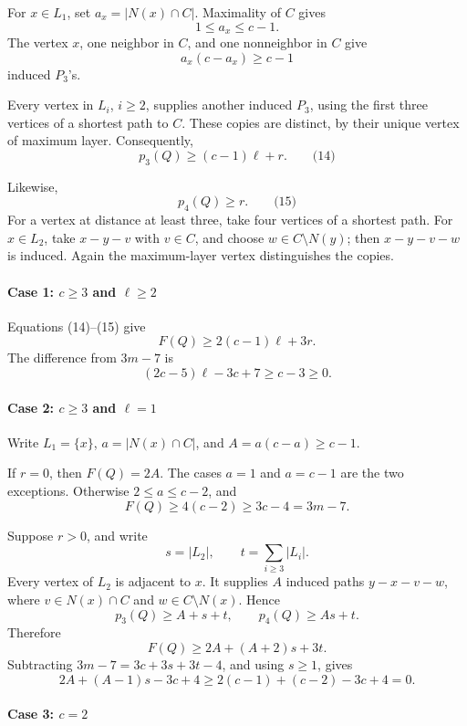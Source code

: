 \documentclass[
  11pt,
  a4paper,
]{article}
\begin{document}
For \(x\in L_1\), set \(a_x=|N(x)\cap C|\). Maximality of \(C\) gives \[
1\le a_x\le c-1.
\] The vertex \(x\), one neighbor in \(C\), and one nonneighbor in \(C\)
give \[
a_x(c-a_x)\ge c-1
\] induced \(P_3\)'s.

Every vertex in \(L_i\), \(i\ge2\), supplies another induced \(P_3\),
using the first three vertices of a shortest path to \(C\). These copies
are distinct, by their unique vertex of maximum layer. Consequently, \[
p_3(Q)\ge(c-1)\ell+r.
\qquad\text{(14)}
\]

Likewise, \[
p_4(Q)\ge r.
\qquad\text{(15)}
\] For a vertex at distance at least three, take four vertices of a
shortest path. For \(x\in L_2\), take \(x-y-v\) with \(v\in C\), and
choose \(w\in C\setminus N(y)\); then \(x-y-v-w\) is induced. Again the
maximum-layer vertex distinguishes the copies.

\paragraph{\texorpdfstring{Case 1: \(c\ge3\) and
\(\ell\ge2\)}{Case 1: c\textbackslash ge3 and \textbackslash ell\textbackslash ge2}}\label{case-1-cge3-and-ellge2}

Equations (14)--(15) give \[
F(Q)\ge2(c-1)\ell+3r.
\] The difference from \(3m-7\) is \[
(2c-5)\ell-3c+7\ge c-3\ge0.
\]

\paragraph{\texorpdfstring{Case 2: \(c\ge3\) and
\(\ell=1\)}{Case 2: c\textbackslash ge3 and \textbackslash ell=1}}\label{case-2-cge3-and-ell1}

Write \(L_1=\{x\}\), \(a=|N(x)\cap C|\), and \(A=a(c-a)\ge c-1\).

If \(r=0\), then \(F(Q)=2A\). The cases \(a=1\) and \(a=c-1\) are the
two exceptions. Otherwise \(2\le a\le c-2\), and \[
F(Q)\ge4(c-2)\ge3c-4=3m-7.
\]

Suppose \(r>0\), and write \[
s=|L_2|,\qquad t=\sum_{i\ge3}|L_i|.
\] Every vertex of \(L_2\) is adjacent to \(x\). It supplies \(A\)
induced paths \(y-x-v-w\), where \(v\in N(x)\cap C\) and
\(w\in C\setminus N(x)\). Hence \[
p_3(Q)\ge A+s+t,
\qquad
p_4(Q)\ge As+t.
\] Therefore \[
F(Q)\ge2A+(A+2)s+3t.
\] Subtracting \(3m-7=3c+3s+3t-4\), and using \(s\ge1\), gives \[
2A+(A-1)s-3c+4
\ge2(c-1)+(c-2)-3c+4=0.
\]

\paragraph{\texorpdfstring{Case 3:
\(c=2\)}{Case 3: c=2}}\label{case-3-c2}
\end{document}
